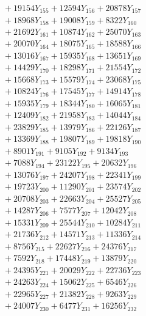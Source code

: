 \documentclass[a4paper,10pt]{article}
\begin{document}
{\begin{align}
&\;  + 19154 Y_{155} + 12594 Y_{156} + 20878 Y_{157} \\[0.3ex]
&\;  + 18968 Y_{158} + 19008 Y_{159} + 8322 Y_{160} \\[0.3ex]
&\;  + 21692 Y_{161} + 10874 Y_{162} + 25070 Y_{163} \\[0.3ex]
&\;  + 20070 Y_{164} + 18075 Y_{165} + 18588 Y_{166} \\[0.3ex]
&\;  + 13016 Y_{167} + 15935 Y_{168} + 13651 Y_{169} \\[0.3ex]
&\;  + 14429 Y_{170} + 18298 Y_{171} + 21554 Y_{172} \\[0.3ex]
&\;  + 15668 Y_{173} + 15579 Y_{174} + 23068 Y_{175} \\[0.3ex]
&\;  + 10824 Y_{176} + 17545 Y_{177} + 14914 Y_{178} \\[0.5ex]\allowbreak
&\;  + 15935 Y_{179} + 18344 Y_{180} + 16065 Y_{181} \\[0.3ex]
&\;  + 12409 Y_{182} + 21958 Y_{183} + 14044 Y_{184} \\[0.3ex]
&\;  + 23829 Y_{185} + 13979 Y_{186} + 22126 Y_{187} \\[0.3ex]
&\;  + 13369 Y_{188} + 19807 Y_{189} + 19818 Y_{190} \\[0.3ex]
&\;  + 8901 Y_{191} + 9105 Y_{192} + 9134 Y_{193} \\[0.3ex]
&\;  + 7088 Y_{194} + 23122 Y_{195} + 20632 Y_{196} \\[0.3ex]
&\;  + 13076 Y_{197} + 24207 Y_{198} + 22341 Y_{199} \\[0.3ex]
&\;  + 19723 Y_{200} + 11290 Y_{201} + 23574 Y_{202} \\[0.3ex]
&\;  + 20708 Y_{203} + 22663 Y_{204} + 25527 Y_{205} \\[0.3ex]
&\;  + 14287 Y_{206} + 7577 Y_{207} + 12042 Y_{208} \\[0.5ex]\allowbreak
&\;  + 15331 Y_{209} + 25544 Y_{210} + 10284 Y_{211} \\[0.3ex]
&\;  + 21736 Y_{212} + 14571 Y_{213} + 11336 Y_{214} \\[0.3ex]
&\;  + 8756 Y_{215} + 22627 Y_{216} + 24376 Y_{217} \\[0.3ex]
&\;  + 7592 Y_{218} + 17448 Y_{219} + 13879 Y_{220} \\[0.3ex]
&\;  + 24395 Y_{221} + 20029 Y_{222} + 22736 Y_{223} \\[0.3ex]
&\;  + 24263 Y_{224} + 15062 Y_{225} + 6546 Y_{226} \\[0.3ex]
&\;  + 22965 Y_{227} + 21382 Y_{228} + 9263 Y_{229} \\[0.3ex]
&\;  + 24007 Y_{230} + 6477 Y_{231} + 16256 Y_{232} \\[0.3ex]

\end{align}}
\end{document}
